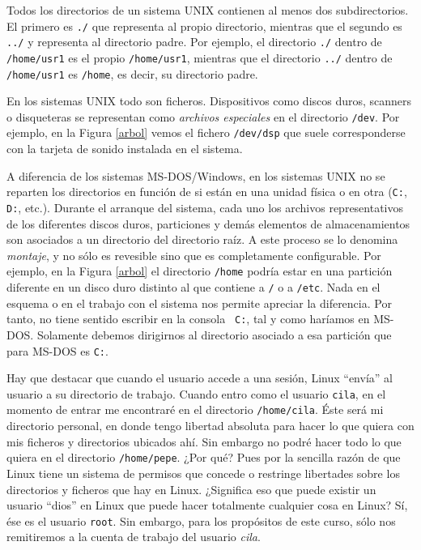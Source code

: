 Todos  los directorios  de  un  sistema UNIX  contienen  al menos  dos
subdirectorios.  El  primero es  {\tt  ./}  que representa  al  propio
directorio,  mientras que  el segundo  es  {\tt ../}  y representa  al
directorio padre. Por  ejemplo, el directorio {\tt ./}  dentro de {\tt
/home/usr1} es el propio {\tt  /home/usr1}, mientras que el directorio
{\tt ../}  dentro de  {\tt /home/usr1}  es {\tt  /home}, es  decir, su
directorio padre.

En  los sistemas  UNIX  todo son  ficheros.  Dispositivos como  discos
duros,  scanners  o  disqueteras  se representan  como  {\em  archivos
especiales} en  el directorio  {\tt /dev}. Por  ejemplo, en  la Figura
\ref{arbol} vemos  el fichero {\tt /dev/dsp}  que suele corresponderse
con la tarjeta de sonido instalada en el sistema.

A diferencia de  los sistemas MS-DOS/Windows, en los  sistemas UNIX no
se  reparten los  directorios en  función de  si están  en una  unidad
física o en  otra ({\tt C:}, {\tt D:}, etc.).  Durante el arranque del
sistema,  cada  uno los  archivos  representativos  de los  diferentes
discos  duros, particiones  y demás  elementos de  almacenamientos son
asociados a  un directorio del directorio  raíz. A este proceso  se lo
denomina {\em montaje}, y no  sólo es revesible sino que
es completamente  configurable. Por ejemplo, en  la Figura \ref{arbol}
el directorio {\tt  /home} podría estar en una  partición diferente en
un disco duro distinto al que contiene  a {\tt /} o a {\tt /etc}. Nada
en el esquema o  en el trabajo con el sistema  nos permite apreciar la
diferencia. Por  tanto, no tiene  sentido escribir en la  consola {\tt
C:}, tal  y como haríamos  en MS-DOS. Solamente debemos  dirigirnos al
directorio asociado a esa partición que para MS-DOS es {\tt C:}.

Hay que  destacar que  cuando el  usuario accede  a una  sesión, Linux
``envía'' al usuario a su directorio  de trabajo. Cuando entro como el
usuario  {\tt cila},  en  el momento  de entrar  me  encontraré en  el
directorio  {\tt /home/cila}.  Éste  será mi  directorio personal,  en
donde  tengo  libertad absoluta  para  hacer  lo  que quiera  con  mis
ficheros y directorios  ubicados ahí. Sin embargo no  podré hacer todo
lo que quiera en el directorio {\tt /home/pepe}. ¿Por qué? Pues por la
sencilla razón de que Linux tiene un sistema de permisos que concede o
restringe  libertades sobre  los  directorios y  ficheros  que hay  en
Linux. ¿Significa eso  que puede existir un usuario  ``dios'' en Linux
que puede  hacer totalmente  cualquier cosa  en Linux?  Sí, ése  es el
usuario {\tt  root}. Sin  embargo, para los  propósitos de
este curso,  sólo nos remitiremos a  la cuenta de trabajo  del usuario
{\em cila}.


